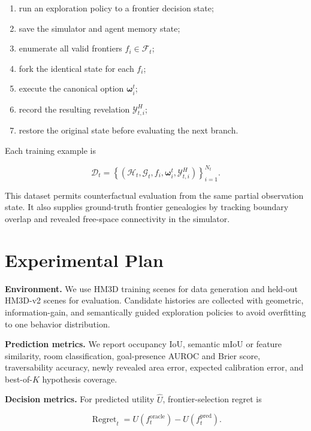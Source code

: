 \documentclass[10pt,twocolumn]{article}
\newcommand{\History}{\mathcal{H}}
\newcommand{\Frontiers}{\mathcal{F}}
\newcommand{\Global}{\mathcal{G}}
\newcommand{\Reveal}{\mathcal{Y}}
\newcommand{\Option}{\boldsymbol{\omega}}
\begin{document}
\begin{enumerate}
    \item run an exploration policy to a frontier decision state;
    \item save the simulator and agent memory state;
    \item enumerate all valid frontiers \(f_i\in\Frontiers_t\);
    \item fork the identical state for each \(f_i\);
    \item execute the canonical option \(\Option_i^t\);
    \item record the resulting revelation \(\Reveal_{t,i}^{H}\);
    \item restore the original state before evaluating the next branch.
\end{enumerate}

Each training example is

\begin{equation}
\mathcal{D}_t
=
\left\{
\left(
\History_t,\Global_t,f_i,\Option_i^t,
\Reveal_{t,i}^{H}
\right)
\right\}_{i=1}^{N_t}.
\end{equation}

This dataset permits counterfactual evaluation from the same partial
observation state. It also supplies ground-truth frontier genealogies by
tracking boundary overlap and revealed free-space connectivity in the
simulator.

\section{Experimental Plan}

\textbf{Environment.}
We use HM3D training scenes for data generation and held-out HM3D-v2 scenes
for evaluation. Candidate histories are collected with geometric,
information-gain, and semantically guided exploration policies to avoid
overfitting to one behavior distribution.

\textbf{Prediction metrics.}
We report occupancy IoU, semantic mIoU or feature similarity, room
classification, goal-presence AUROC and Brier score, traversability accuracy,
newly revealed area error, expected calibration error, and best-of-\(K\)
hypothesis coverage.

\textbf{Decision metrics.}
For predicted utility \(\widehat U\), frontier-selection regret is

\begin{equation}
\operatorname{Regret}_t
=
U
\left(
f_t^{\mathrm{oracle}}
\right)
-
U
\left(
f_t^{\mathrm{pred}}
\right).
\end{equation}
\end{document}
